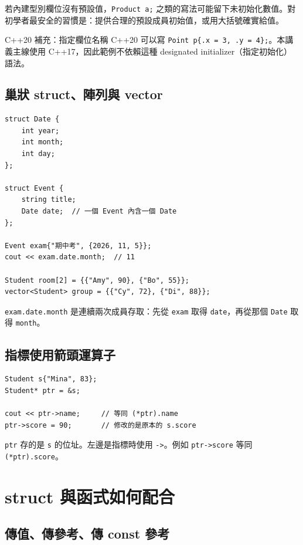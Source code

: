 \documentclass[11pt,a4paper]{article}
\newcommand{\code}[1]{\texttt{#1}}
\begin{document}
若內建型別欄位沒有預設值，\code{Product a;} 之類的寫法可能留下未初始化數值。對初學者最安全的習慣是：提供合理的預設成員初始值，或用大括號確實給值。

\begin{skipbox}{C++20 補充：指定欄位名稱}
C++20 可以寫 \code{Point p\{.x = 3, .y = 4\};}。本講義主線使用 C++17，因此範例不依賴這種 designated initializer（指定初始化）語法。
\end{skipbox}

\subsection{巢狀 struct、陣列與 vector}

\begin{lstlisting}
struct Date {
    int year;
    int month;
    int day;
};

struct Event {
    string title;
    Date date;  // 一個 Event 內含一個 Date
};

Event exam{"期中考", {2026, 11, 5}};
cout << exam.date.month;  // 11

Student room[2] = {{"Amy", 90}, {"Bo", 55}};
vector<Student> group = {{"Cy", 72}, {"Di", 88}};
\end{lstlisting}

\code{exam.date.month} 是連續兩次成員存取：先從 \code{exam} 取得 \code{date}，再從那個 \code{Date} 取得 \code{month}。

\subsection{指標使用箭頭運算子}

\begin{lstlisting}
Student s{"Mina", 83};
Student* ptr = &s;

cout << ptr->name;     // 等同 (*ptr).name
ptr->score = 90;       // 修改的是原本的 s.score
\end{lstlisting}

\code{ptr} 存的是 \code{s} 的位址。左邊是指標時使用 \code{->}。例如 \code{ptr->score} 等同 \code{(*ptr).score}。

\section{struct 與函式如何配合}

\subsection{傳值、傳參考、傳 const 參考}
\end{document}
